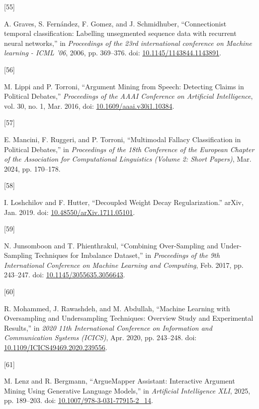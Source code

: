 \documentclass[twocolumn,twoside]{article}
\newlength{\cslhangindent}
\newlength{\csllabelwidth}
\newenvironment{CSLReferences}[2] %
 {\begin{list}{}{%
  \setlength{\itemindent}{0pt}
  \setlength{\leftmargin}{0pt}
  \setlength{\parsep}{0pt}
  \ifodd #1
   \setlength{\leftmargin}{\cslhangindent}
   \setlength{\itemindent}{-1\cslhangindent}
  \fi
  \setlength{\itemsep}{#2\baselineskip}}}
 {\end{list}}
\newcommand{\CSLLeftMargin}[1]{\parbox[t]{\csllabelwidth}{\strut#1\strut}}
\newcommand{\CSLRightInline}[1]{\parbox[t]{\linewidth - \csllabelwidth}{\strut#1\strut}}
\begin{document}
\begin{CSLReferences}{0}{0}
\CSLLeftMargin{{[}55{]} }%
\CSLRightInline{A. Graves, S. Fernández, F. Gomez, and J. Schmidhuber,
{``Connectionist temporal classification: Labelling unsegmented sequence
data with recurrent neural networks,''} in \emph{Proceedings of the 23rd
international conference on {Machine} learning - {ICML} '06}, 2006, pp.
369--376. doi:
\href{https://doi.org/10.1145/1143844.1143891}{10.1145/1143844.1143891}.}

\CSLLeftMargin{{[}56{]} }%
\CSLRightInline{M. Lippi and P. Torroni, {``Argument {Mining} from
{Speech}: {Detecting Claims} in {Political Debates},''}
\emph{Proceedings of the AAAI Conference on Artificial Intelligence},
vol. 30, no. 1, Mar. 2016, doi:
\href{https://doi.org/10.1609/aaai.v30i1.10384}{10.1609/aaai.v30i1.10384}.}

\CSLLeftMargin{{[}57{]} }%
\CSLRightInline{E. Mancini, F. Ruggeri, and P. Torroni, {``Multimodal
{Fallacy Classification} in {Political Debates},''} in \emph{Proceedings
of the 18th {Conference} of the {European Chapter} of the {Association}
for {Computational Linguistics} ({Volume} 2: {Short Papers})}, Mar.
2024, pp. 170--178.}

\CSLLeftMargin{{[}58{]} }%
\CSLRightInline{I. Loshchilov and F. Hutter, {``Decoupled {Weight Decay
Regularization}.''} arXiv, Jan. 2019. doi:
\href{https://doi.org/10.48550/arXiv.1711.05101}{10.48550/arXiv.1711.05101}.}

\CSLLeftMargin{{[}59{]} }%
\CSLRightInline{N. Junsomboon and T. Phienthrakul, {``Combining
{Over-Sampling} and {Under-Sampling Techniques} for {Imbalance
Dataset},''} in \emph{Proceedings of the 9th {International Conference}
on {Machine Learning} and {Computing}}, Feb. 2017, pp. 243--247. doi:
\href{https://doi.org/10.1145/3055635.3056643}{10.1145/3055635.3056643}.}

\CSLLeftMargin{{[}60{]} }%
\CSLRightInline{R. Mohammed, J. Rawashdeh, and M. Abdullah, {``Machine
{Learning} with {Oversampling} and {Undersampling Techniques}: {Overview
Study} and {Experimental Results},''} in \emph{2020 11th {International
Conference} on {Information} and {Communication Systems} ({ICICS})},
Apr. 2020, pp. 243--248. doi:
\href{https://doi.org/10.1109/ICICS49469.2020.239556}{10.1109/ICICS49469.2020.239556}.}

\CSLLeftMargin{{[}61{]} }%
\CSLRightInline{M. Lenz and R. Bergmann, {``{ArgueMapper Assistant}:
{Interactive Argument Mining Using Generative Language Models},''} in
\emph{Artificial {Intelligence XLI}}, 2025, pp. 189--203. doi:
\href{https://doi.org/10.1007/978-3-031-77915-2_14}{10.1007/978-3-031-77915-2\_14}.}

\end{CSLReferences}
\end{document}
